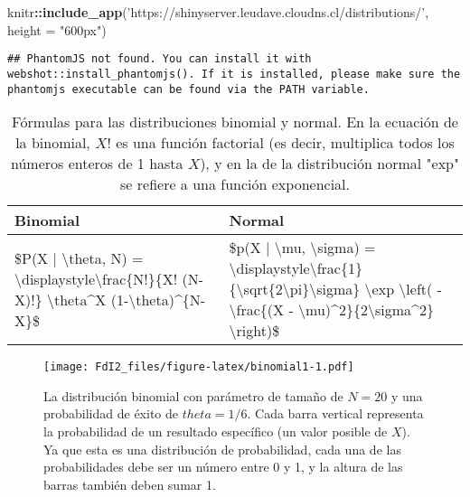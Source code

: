 \documentclass[spanish,]{book}
\newenvironment{Shaded}{\begin{snugshade}}{\end{snugshade}}
\newcommand{\KeywordTok}[1]{\textcolor[rgb]{0.13,0.29,0.53}{\textbf{#1}}}
\newcommand{\DataTypeTok}[1]{\textcolor[rgb]{0.13,0.29,0.53}{#1}}
\newcommand{\StringTok}[1]{\textcolor[rgb]{0.31,0.60,0.02}{#1}}
\newcommand{\OperatorTok}[1]{\textcolor[rgb]{0.81,0.36,0.00}{\textbf{#1}}}
\newcommand{\NormalTok}[1]{#1}
\begin{document}
\begin{Shaded}
\begin{Highlighting}[]
\NormalTok{knitr}\OperatorTok{::}\KeywordTok{include_app}\NormalTok{(}\StringTok{'https://shinyserver.leudave.cloudns.cl/distributions/'}\NormalTok{, }\DataTypeTok{height =} \StringTok{"600px"}\NormalTok{)}
\end{Highlighting}
\end{Shaded}

\begin{verbatim}
## PhantomJS not found. You can install it with webshot::install_phantomjs(). If it is installed, please make sure the phantomjs executable can be found via the PATH variable.
\end{verbatim}

\begin{table}[t]

\caption{\label{tab:distformulas}Fórmulas para las distribuciones binomial y normal. En la ecuación de la binomial, $X!$ es una función factorial (es decir, multiplica todos los números enteros de  1 hasta $X$), y en la de la distribución normal "exp" se refiere a una función exponencial.}
\centering
\begin{tabular}{l|l}
\hline
Binomial & Normal\\
\hline
\$P(X | \textbackslash{}theta, N) = \textbackslash{}displaystyle\textbackslash{}frac\{N!\}\{X! (N-X)!\}  \textbackslash{}theta\textasciicircum{}X (1-\textbackslash{}theta)\textasciicircum{}\{N-X\}\$ & \$p(X | \textbackslash{}mu, \textbackslash{}sigma) = \textbackslash{}displaystyle\textbackslash{}frac\{1\}\{\textbackslash{}sqrt\{2\textbackslash{}pi\}\textbackslash{}sigma\} \textbackslash{}exp \textbackslash{}left( -\textbackslash{}frac\{(X - \textbackslash{}mu)\textasciicircum{}2\}\{2\textbackslash{}sigma\textasciicircum{}2\} \textbackslash{}right)\$\\
\hline
\end{tabular}
\end{table}

\begin{figure}
\centering
\texttt{[image: FdI2\_files/figure-latex/binomial1-1.pdf]}
\caption{\label{fig:binomial1} La distribución binomial con parámetro de
tamaño de \(N=20\) y una probabilidad de éxito de \(theta = 1/6\). Cada
barra vertical representa la probabilidad de un resultado específico (un
valor posible de \(X\)). Ya que esta es una distribución de
probabilidad, cada una de las probabilidades debe ser un número entre 0
y 1, y la altura de las barras también deben sumar 1.}
\end{figure}
\end{document}
